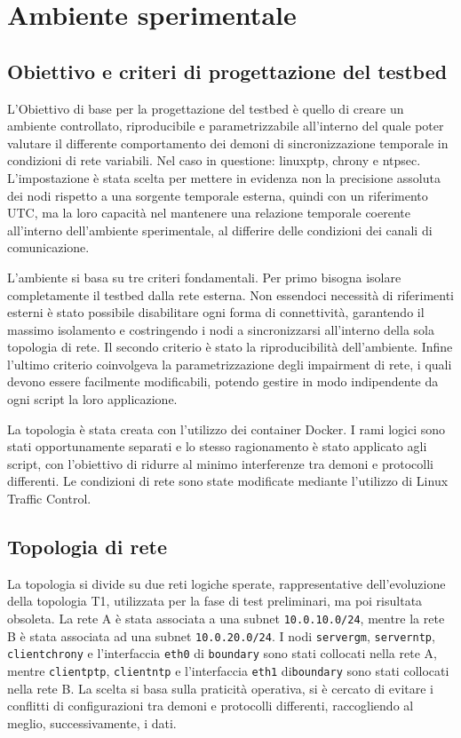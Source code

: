 \chapter{Ambiente sperimentale}
\label{cha:ambienteSperimentale}

\section{Obiettivo e criteri di progettazione del testbed}

L'Obiettivo di base per la progettazione del testbed è quello di creare un ambiente
controllato, riproducibile e parametrizzabile all'interno del quale poter
valutare il differente comportamento dei demoni di sincronizzazione temporale in
condizioni di rete variabili. Nel caso in questione: linuxptp, chrony e ntpsec.
L'impostazione è stata scelta per mettere in evidenza non la precisione assoluta
dei nodi rispetto a una sorgente temporale esterna, quindi con un riferimento UTC,
ma la loro capacità nel mantenere una relazione temporale coerente all'interno
dell'ambiente sperimentale, al differire delle condizioni dei canali di comunicazione.

L'ambiente si basa su tre criteri fondamentali. Per primo bisogna isolare
completamente il testbed dalla rete esterna. Non essendoci necessità di riferimenti
esterni è stato possibile disabilitare ogni forma di connettività, garantendo il
massimo isolamento e costringendo i nodi a sincronizzarsi all'interno della sola
topologia di rete. Il secondo criterio è stato la riproducibilità dell'ambiente.
Infine l'ultimo criterio coinvolgeva la parametrizzazione degli impairment di
rete, i quali devono essere facilmente modificabili, potendo gestire in modo
indipendente da ogni script la loro applicazione.

La topologia è stata creata con l'utilizzo dei container Docker. I rami logici sono
stati opportunamente separati e lo stesso ragionamento è stato applicato agli script,
con l'obiettivo di ridurre al minimo interferenze tra demoni e protocolli
differenti. Le condizioni di rete sono state modificate mediante l'utilizzo di Linux
Traffic Control.

\section{Topologia di rete}
La topologia si divide su due reti logiche sperate, rappresentative dell'evoluzione
della topologia T1, utilizzata per la fase di test preliminari, ma poi risultata
obsoleta. La rete A è stata associata a una subnet \texttt{10.0.10.0/24}, mentre la
rete B è stata associata ad una subnet \texttt{10.0.20.0/24}. I nodi \texttt{servergm},
\texttt{serverntp}, \texttt{clientchrony} e l'interfaccia \texttt{eth0} di \texttt{boundary}
sono stati collocati nella rete A, mentre \texttt{clientptp}, \texttt{clientntp}
e l'interfaccia \texttt{eth1} di\texttt{boundary} sono stati collocati nella rete
B. La scelta si basa sulla praticità operativa, si è cercato di evitare i conflitti
di configurazioni tra demoni e protocolli differenti, raccogliendo al meglio, successivamente,
i dati.

